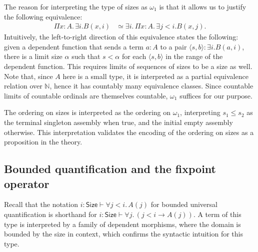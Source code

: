 \documentclass[10pt,a4paper]{article}
\theoremstyle{definition}
\theoremstyle{remark}
\renewcommand{\.}{.\,} %
\renewcommand{\:}{:} %
\newcommand{\bN}{\mathbb{N}}
\newcommand{\brac}[1]{\langle {#1} \rangle }
\newcommand{\Size}{\mathsf{Size}}
\newcommand{\0}{\mathbf{0}}
\newcommand{\1}{\mathbf{1}}
\newcommand\<\langle
\renewcommand\>\rangle
\newcommand{\dom}{\text{dom}}
\theoremstyle{remark}
\begin{document}
The reason for interpreting the type of sizes as $\omega_1$ is that it allows us to justify the following equivalence:
\begin{align*}
	\Pi{x : A} \. \exists i . B(x, i)&\simeq\exists i\. \Pi {x : A} \. \exists j < i . B(x, j). \tag{\(\exists\) parametric over \(\Pi\)}
\end{align*}
Intuitively, the left-to-right direction of this equivalence states the following: given a dependent function that sends a term \( a : A \) to a pair $\langle s, b \rangle : \exists i . B(a, i)$, there is a limit size $\alpha$ such that $s < \alpha$ for each $\brac{s, b}$ in the range of the dependent function. This requires limits of sequences of sizes to be a size as well. Note that, since $A$ here is a small type, it is interpreted as a partial equivalence relation over $\bN$, hence it has countably many equivalence classes. Since countable limits of countable ordinals are themselves countable, $\omega_1$ suffices for our purpose.

The ordering on sizes is interpreted as the ordering on \( \omega_1 \), interpreting \( s_1 \le s_2 \) as the terminal singleton assembly when true, and the initial empty assembly otherwise. This interpretation validates the encoding of the ordering on sizes as a proposition in the theory.

\subsection{Bounded quantification and the fixpoint operator}
Recall that the notation $i : \Size \vdash \forall j < i \. A(j)$ for bounded universal quantification is shorthand for $i : \Size \vdash \forall j \. (j < i \to A(j))$. A term of this type is interpreted by a family of dependent morphisms, where the domain is bounded by the size in context, which confirms the syntactic intuition for this type.

%
\end{document}
